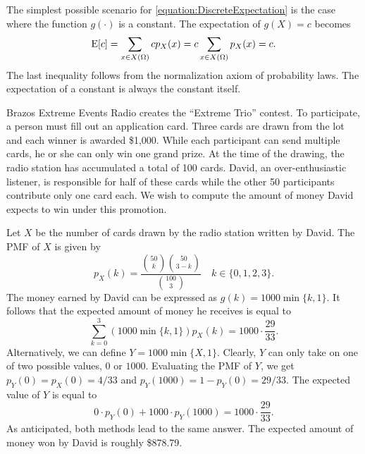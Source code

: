 \begin{example}
The simplest possible scenario for \eqref{equation:DiscreteExpectation} is the case where the function $g(\cdot)$ is a constant.
The expectation of $g(X) = c$ becomes
\begin{equation*}
\mathrm{E} [ c ]
= \sum_{x \in X(\Omega)} c p_X (x)
= c \sum_{x \in X(\Omega)} p_X (x)
= c .
\end{equation*}
The last inequality follows from the normalization axiom of probability laws.
The expectation of a constant is always the constant itself.
\end{example}

\begin{example}
Brazos Extreme Events Radio creates the ``Extreme Trio'' contest.
To participate, a person must fill out an application card.
Three cards are drawn from the lot and each winner is awarded \$1,000.
While each participant can send multiple cards, he or she can only win one grand prize.
At the time of the drawing, the radio station has accumulated a total of 100 cards.
David, an over-enthusiastic listener, is responsible for half of these cards while the other 50 participants contribute only one card each.
We wish to compute the amount of money David expects to win under this promotion.

Let $X$ be the number of cards drawn by the radio station written by David.
The PMF of $X$ is given by
\begin{equation*}
p_X(k) = \frac{\binom{50}{k} \binom{50}{3-k}}{\binom{100}{3}}
\quad k \in \{ 0, 1, 2, 3 \}.
\end{equation*}
The money earned by David can be expressed as $g(k) = 1000 \min \{ k,1 \}$.
It follows that the expected amount of money he receives is equal to
\begin{equation*}
\sum_{k=0}^3 \left( 1000 \min \{ k, 1 \} \right) p_X(k)
= 1000 \cdot \frac{29}{33} .
\end{equation*}
Alternatively, we can define $Y = 1000 \min \{ X, 1 \}$.
Clearly, $Y$ can only take on one of two possible values, $0$ or $1000$.
Evaluating the PMF of $Y$, we get $p_Y(0) = p_X(0) = 4/33$ and $p_Y(1000) = 1 - p_Y(0) = 29/33$.
The expected value of $Y$ is equal to
\begin{equation*}
0 \cdot p_Y(0) + 1000 \cdot p_Y(1000) = 1000 \cdot \frac{29}{33} .
\end{equation*}
As anticipated, both methods lead to the same answer.
The expected amount of money won by David is roughly \$878.79.
\end{example}


